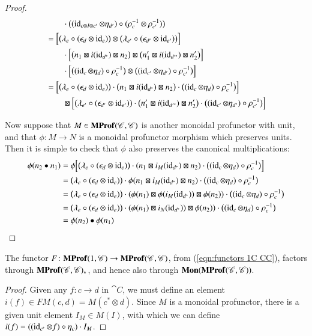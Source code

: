 \documentclass[12pt,oneside,article,draft]{memoir}
\begin{document}
\begin{proof}
\begin{align*}
		&\qquad \cdot\bigl((\operatorname{id}_{c\otimes I\otimes c'}\otimes\eta_{d'})\circ(\rho_c^{-1}\otimes\rho_{c'}^{-1})\bigr) \\
		&= \Bigl[\bigl(\lambda_e\circ(\epsilon_d\otimes\operatorname{id}_e)\bigr)\otimes\bigl(\lambda_{e'}\circ(\epsilon_{d'}\otimes\operatorname{id}_{e'})\bigr)\Bigr] \\
		&\qquad \cdot\Bigl[\bigl(n_1\boxtimes i(\operatorname{id}_{d^*})\boxtimes n_2\bigr)\boxtimes\bigl(n'_1\boxtimes i(\operatorname{id}_{d'^*})\boxtimes n'_2\bigr)\Bigr] \\
		&\qquad \cdot\Bigl[\bigl((\operatorname{id}_c\otimes\eta_d)\circ\rho_c^{-1}\bigr)\otimes\bigl((\operatorname{id}_{c'}\otimes\eta_{d'})\circ\rho_{c'}^{-1}\bigr)\Bigr] \\
		&= \Bigl[\bigl(\lambda_e\circ(\epsilon_d\otimes\operatorname{id}_e)\bigr)\cdot\bigl(n_1\boxtimes i(\operatorname{id}_{d^*})\boxtimes n_2\bigr)\cdot\bigl((\operatorname{id}_c\otimes\eta_d)\circ\rho_c^{-1}\bigr)\Bigr] \\
		&\qquad \boxtimes\Bigl[\bigl(\lambda_{e'}\circ(\epsilon_{d'}\otimes\operatorname{id}_{e'})\bigr)\cdot\bigl(n'_1\boxtimes i(\operatorname{id}_{d'^*})\boxtimes n'_2\bigr)\cdot\bigl((\operatorname{id}_{c'}\otimes\eta_{d'})\circ\rho_{c'}^{-1}\bigr)\Bigr]
	\end{align*}

	Now suppose that $M\in\mathbf{MProf}(\mathscr{C},\mathscr{C})$ is another monoidal profunctor with unit, and that $\phi\colon M\to N$ is a monoidal profunctor morphism which preserves units.
	Then it is simple to check that $\phi$ also preserves the canonical multiplications:
	\begin{align*}
		\phi(n_2\bullet n_1) &= \phi\Bigl[\bigl(\lambda_e\circ(\epsilon_d\otimes\operatorname{id}_e)\bigr)\cdot(n_1\boxtimes i_M(\operatorname{id}_{d^*})\boxtimes n_2)\cdot\bigl((\operatorname{id}_c\otimes \eta_d)\circ\rho_c^{-1}\bigr)\Bigr] \\
		&= \bigl(\lambda_e\circ(\epsilon_d\otimes\operatorname{id}_e)\bigr)\cdot\phi(n_1\boxtimes i_M(\operatorname{id}_{d^*})\boxtimes n_2)\cdot\bigl((\operatorname{id}_c\otimes \eta_d)\circ\rho_c^{-1}\bigr) \\
		&= \bigl(\lambda_e\circ(\epsilon_d\otimes\operatorname{id}_e)\bigr)\cdot(\phi(n_1)\boxtimes \phi(i_M(\operatorname{id}_{d^*}))\boxtimes \phi(n_2))\cdot\bigl((\operatorname{id}_c\otimes \eta_d)\circ\rho_c^{-1}\bigr) \\
		&= \bigl(\lambda_e\circ(\epsilon_d\otimes\operatorname{id}_e)\bigr)\cdot(\phi(n_1)\boxtimes i_N(\operatorname{id}_{d^*}))\boxtimes \phi(n_2))\cdot\bigl((\operatorname{id}_c\otimes \eta_d)\circ\rho_c^{-1}\bigr) \\
		&= \phi(n_2)\bullet\phi(n_1)
	\end{align*}
\end{proof}

\begin{proposition}\label{Prop:canonical unit}
	The functor $F\colon\mathbf{MProf}(1,\mathscr{C})\to\mathbf{MProf}(\mathscr{C},\mathscr{C})$, from (\ref{eqn:functors 1C CC}), factors through $\mathbf{MProf}(\mathscr{C},\mathscr{C})_*$, and hence also through $\mathbf{Mon}(\mathbf{MProf}(\mathscr{C},\mathscr{C}))$.
\end{proposition}
\begin{proof}
	Given any $f\colon c\to d$ in $\cat{C}$, we must define an element $i(f)\in FM(c,d)=M(c^*\otimes d)$.
	Since $M$ is a monoidal profunctor, there is a given unit element $I_M\in M(I)$, with which we can define $i(f)=((\operatorname{id}_{c^*}\otimes f)\circ\eta_c)\cdot I_M$.
\end{proof}
\end{document}
